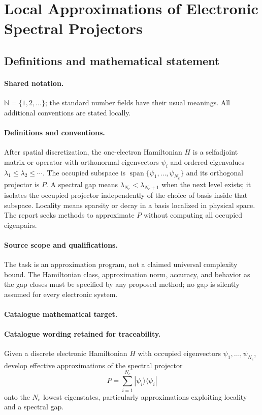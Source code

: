 \documentclass[11pt]{article}
\begin{document}
\section{Local Approximations of Electronic Spectral Projectors}\label{statement}

\subsection{Definitions and mathematical statement}

\paragraph{Shared notation.}$\mathbb N=\{1,2,\ldots\}$; the standard number fields have their usual meanings. All additional conventions are stated locally.


\paragraph{Definitions and conventions.} After spatial discretization, the one-electron Hamiltonian $H$ is a selfadjoint matrix or operator with orthonormal eigenvectors $\psi_i$ and ordered eigenvalues $\lambda_1\le\lambda_2\le\cdots$. The occupied subspace is $\operatorname{span}\{\psi_1,\ldots,\psi_{N_e}\}$ and its orthogonal projector is $P$. A spectral gap means $\lambda_{N_e}<\lambda_{N_e+1}$ when the next level exists; it isolates the occupied projector independently of the choice of basis inside that subspace. Locality means sparsity or decay in a basis localized in physical space. The report seeks methods to approximate $P$ without computing all occupied eigenpairs.

\paragraph{Source scope and qualifications.} The task is an approximation program, not a claimed universal complexity bound. The Hamiltonian class, approximation norm, accuracy, and behavior as the gap closes must be specified by any proposed method; no gap is silently assumed for every electronic system.

\paragraph{Catalogue mathematical target.}
\paragraph{Catalogue wording retained for traceability.}
Given a discrete electronic Hamiltonian $H$ with occupied eigenvectors $\psi_1,\ldots,\psi_{N_e}$, develop effective approximations of the spectral projector $$P=\sum_{i=1}^{N_e}|\psi_i\rangle\langle\psi_i|$$ onto the $N_e$ lowest eigenstates, particularly approximations exploiting locality and a spectral gap.
\end{document}
